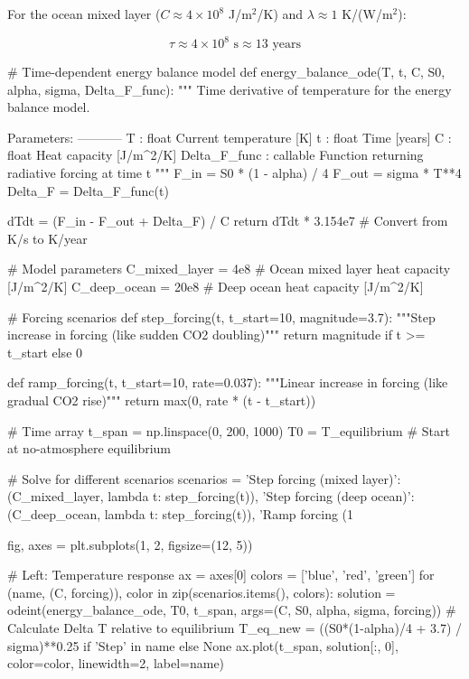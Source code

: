 \documentclass[11pt,a4paper]{article}
\begin{document}
For the ocean mixed layer ($C \approx 4 \times 10^8$ J/m$^2$/K) and $\lambda \approx 1$ K/(W/m$^2$):

\begin{equation}
\tau \approx 4 \times 10^8 \text{ s} \approx 13 \text{ years}
\end{equation}

\begin{pycode}
# Time-dependent energy balance model
def energy_balance_ode(T, t, C, S0, alpha, sigma, Delta_F_func):
    """
    Time derivative of temperature for the energy balance model.

    Parameters:
    -----------
    T : float
        Current temperature [K]
    t : float
        Time [years]
    C : float
        Heat capacity [J/m^2/K]
    Delta_F_func : callable
        Function returning radiative forcing at time t
    """
    F_in = S0 * (1 - alpha) / 4
    F_out = sigma * T**4
    Delta_F = Delta_F_func(t)

    dTdt = (F_in - F_out + Delta_F) / C
    return dTdt * 3.154e7  # Convert from K/s to K/year

# Model parameters
C_mixed_layer = 4e8  # Ocean mixed layer heat capacity [J/m^2/K]
C_deep_ocean = 20e8  # Deep ocean heat capacity [J/m^2/K]

# Forcing scenarios
def step_forcing(t, t_start=10, magnitude=3.7):
    """Step increase in forcing (like sudden CO2 doubling)"""
    return magnitude if t >= t_start else 0

def ramp_forcing(t, t_start=10, rate=0.037):
    """Linear increase in forcing (like gradual CO2 rise)"""
    return max(0, rate * (t - t_start))

# Time array
t_span = np.linspace(0, 200, 1000)
T0 = T_equilibrium  # Start at no-atmosphere equilibrium

# Solve for different scenarios
scenarios = {
    'Step forcing (mixed layer)': (C_mixed_layer, lambda t: step_forcing(t)),
    'Step forcing (deep ocean)': (C_deep_ocean, lambda t: step_forcing(t)),
    'Ramp forcing (1%
}

fig, axes = plt.subplots(1, 2, figsize=(12, 5))

# Left: Temperature response
ax = axes[0]
colors = ['blue', 'red', 'green']
for (name, (C, forcing)), color in zip(scenarios.items(), colors):
    solution = odeint(energy_balance_ode, T0, t_span,
                      args=(C, S0, alpha, sigma, forcing))
    # Calculate Delta T relative to equilibrium
    T_eq_new = ((S0*(1-alpha)/4 + 3.7) / sigma)**0.25 if 'Step' in name else None
    ax.plot(t_span, solution[:, 0], color=color, linewidth=2, label=name)


\end{pycode}
\end{document}
